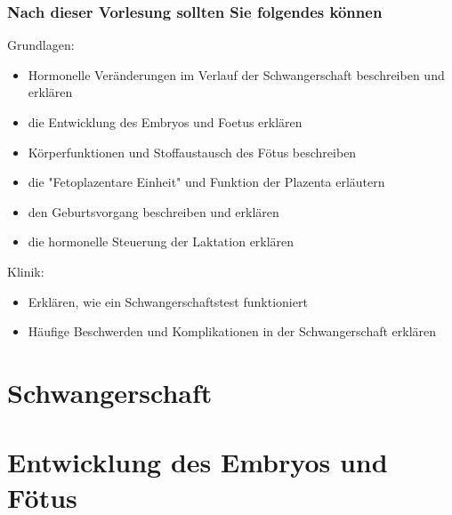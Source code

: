 \documentclass{beamer}
\begin{document}
\begin{frame}

 \frametitle{Nach dieser Vorlesung sollten Sie folgendes können}



\begin{block}{Grundlagen:}
\begin{itemize}
\item
Hormonelle Veränderungen im Verlauf der Schwangerschaft beschreiben und erklären
\item
die Entwicklung des Embryos und Foetus erklären 
\item
Körperfunktionen und Stoffaustausch des Fötus beschreiben
\item
die "Fetoplazentare Einheit" und Funktion der Plazenta erläutern
\item
den Geburtsvorgang beschreiben und erklären
\item
die hormonelle Steuerung der Laktation erklären

\end{itemize}

\end{block}



\begin{block}{Klinik:}
\begin{itemize}
\item
Erklären, wie ein Schwangerschaftstest funktioniert
\item
Häufige Beschwerden und Komplikationen in der Schwangerschaft erklären

\end{itemize}

\end{block}

\end{frame}




\section{Schwangerschaft}





\section{Entwicklung des Embryos und Fötus}
\end{document}
